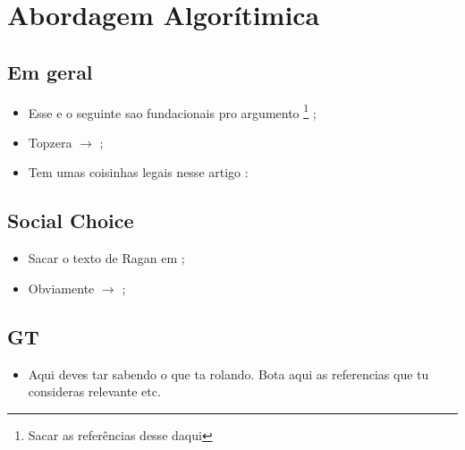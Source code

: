 \documentclass{article}
\begin{document}
\section{Abordagem Algorítimica}

\subsection{Em geral}

\begin{itemize}
\item Esse e o seguinte sao fundacionais pro
  argumento \textcite{sep-social-procedures} \footnote{Sacar as referências desse
    daqui} ;
\item Topzera \(\rightarrow \) \textcite{eijck2009discourses}; 
\item Tem umas coisinhas legais nesse artigo : \textcite{page2008uncertainty}
\end{itemize}


\subsection{Social Choice}
\begin{itemize}
\item Sacar o texto de Ragan em \textcite{heckelman2015handbook};
\item Obviamente \(\rightarrow\) \textcite{brandt2016handbook};
\end{itemize}

\subsection{GT}


\begin{itemize}
\item Aqui deves tar sabendo o que ta rolando. Bota aqui as referencias que tu
  consideras relevante etc. 
\end{itemize}



\printbibliography
\end{document}
